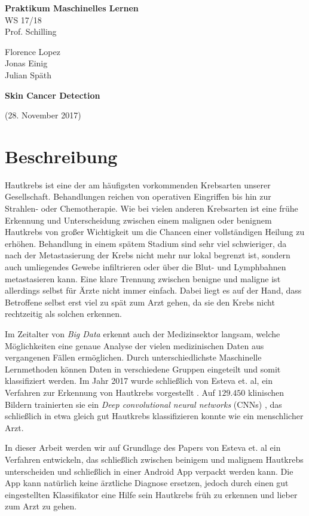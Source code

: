\documentclass[%
   10pt,              %
   a4paper,           %
   DIV10,             %
]{scrartcl}%
\def\header#1#2#3#4#5#6{\pagestyle{empty}
\noindent
\begin{minipage}[t]{0.6\textwidth}
\begin{flushleft}
\textbf{#4}\\%
#6\\%
#2  %
\end{flushleft}
\end{minipage}
\begin{minipage}[t]{0.4\textwidth}
\begin{flushright}
\vspace*{0.2cm}
#5%
\end{flushright}
\end{minipage}

\begin{center}
{\Large\textbf{ #1}} %

{(#3)} %
\end{center}
}
\begin{document}
\header{Skin Cancer Detection}{Prof. Schilling}{28. November 2017}{Praktikum Maschinelles Lernen}{Florence Lopez \\ Jonas Einig \\ Julian Späth}{WS 17/18}

\section*{Beschreibung}
Hautkrebs ist eine der am häufigsten vorkommenden Krebsarten unserer Gesellschaft\cite{cancer}. Behandlungen reichen von operativen Eingriffen bis hin zur Strahlen- oder Chemotherapie. Wie bei vielen anderen Krebsarten ist eine frühe Erkennung und Unterscheidung zwischen einem malignen oder benignem Hautkrebs von großer Wichtigkeit um die Chancen einer vollständigen Heilung zu erhöhen. Behandlung in einem spätem Stadium sind sehr viel schwieriger, da nach der Metastasierung der Krebs nicht mehr nur lokal begrenzt ist, sondern auch umliegendes Gewebe infiltrieren oder über die Blut- und Lymphbahnen metastasieren kann. Eine klare Trennung zwischen benigne und maligne ist allerdings selbst für Ärzte nicht immer einfach. Dabei liegt es auf der Hand, dass Betroffene selbst erst viel zu spät zum Arzt gehen, da sie den Krebs nicht rechtzeitig als solchen erkennen.

Im Zeitalter von \textit{Big Data} erkennt auch der Medizinsektor langsam, welche Möglichkeiten    eine genaue Analyse der vielen medizinischen Daten aus vergangenen Fällen ermöglichen. Durch unterschiedlichste Maschinelle Lernmethoden können Daten in verschiedene Gruppen eingeteilt und somit klassifiziert werden. Im Jahr 2017 wurde schließlich von Esteva et. al, ein Verfahren zur Erkennung von Hautkrebs vorgestellt \cite{skincancer}. Auf $129.450$ klinischen Bildern trainierten sie ein \textit{Deep convolutional neural networks} (CNNs) \cite{cnn}, das schließlich in etwa gleich gut Hautkrebs klassifizieren konnte wie ein menschlicher Arzt.

In dieser Arbeit werden wir auf Grundlage des Papers von Esteva et. al ein Verfahren entwickeln, das schließlich zwischen beinigem und malignem Hautkrebs unterscheiden und schließlich in einer Android App verpackt werden kann. Die App kann natürlich keine ärztliche Diagnose ersetzen, jedoch durch einen gut eingestellten Klassifikator eine Hilfe sein Hautkrebs früh zu erkennen und lieber zum Arzt zu gehen. 
\end{document}
